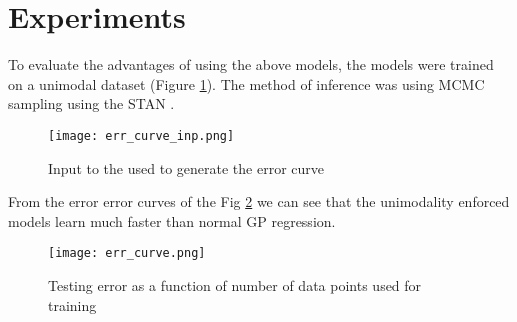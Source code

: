 \section{Experiments}
To evaluate the advantages of using the above models, the models were trained on a unimodal dataset (Figure \ref{fig:err_curve_inp}). The method of inference was using MCMC sampling using the STAN \citep{stanpaperref}. 


\begin{figure}[h]
  \texttt{[image: err\_curve\_inp.png]}
  \centering
  \caption{Input to the used to generate the error curve}
  \label{fig:err_curve_inp}
\end{figure}


From the error error curves of the Fig \ref{fig:err_curve} we can see that the unimodality enforced models learn much faster than normal GP regression.
\begin{figure}[h]
  \texttt{[image: err\_curve.png]}
  \centering
  \caption{Testing error as a function of number of data points used for training}
  \label{fig:err_curve}
\end{figure}